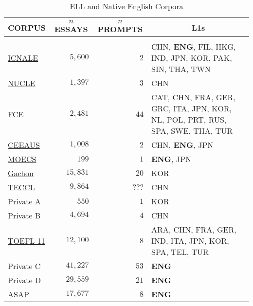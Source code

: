 \documentclass{article} %
\begin{document}
\begin{table}[t]
\caption{ELL and Native English Corpora}
\label{data-table}
\begin{center}
\begin{tabularx}{\textwidth}{l r r X}
\multicolumn{1}{c}{\bf CORPUS} &\multicolumn{1}{c}{\bf $n$ ESSAYS} &\multicolumn{1}{c}{\bf $n$ PROMPTS} &\multicolumn{1}{c}{\bf L1s}
\\ \hline \\
\hline
\href{http://language.sakura.ne.jp/icnale/}{ICNALE} & $5,600$ & $2$ & CHN, \textbf{ENG}, FIL, HKG, IND, JPN, \newline KOR, PAK, SIN, THA, TWN \\
\href{http://www.comp.nus.edu.sg/~nlp/conll14st.html\#nucle32}{NUCLE} & $1,397$ & $3$ & CHN \\
\href{http://ilexir.co.uk/datasets/index.html}{FCE} & $2,481$ & $44$ & CAT, CHN, FRA, GER, GRC, ITA, \newline JPN, KOR, NL, POL, PRT, RUS, \newline SPA, SWE, THA, TUR \\
\href{https://meta-toolkit.org/data/2016-01-26/ceeaus.tar.gz}{CEEAUS} & $1,008$ & $2$ & CHN, \textbf{ENG}, JPN \\
\href{http://www.u-sacred-heart.ac.jp/okugiri/links/moecs/links/data/data.html}{MOECS} & $199$ & $1$ & \textbf{ENG}, JPN \\
\href{http://koreanlearnercorpusblog.blogspot.be/p/corpus.html}{Gachon} & $15,831$ & $20$ & KOR \\
\href{http://www.bfsu-corpus.org/static/corpora/TECCL_Corpus_V1.1.zip}{TECCL} & $9,864$ & $???$ & CHN \\
Private A & $550$ & $1$ & KOR \\
Private B & $4,694$ & $4$ & CHN \\
\href{https://catalog.ldc.upenn.edu/LDC2014T06}{TOEFL-11} & $12,100$ & $8$ & ARA, CHN, FRA, GER, IND, ITA, \newline JPN, KOR, SPA, TEL, TUR \\
Private C & $41,227$ & $53$ & \textbf{ENG} \\
Private D & $29,559$ & $21$ & \textbf{ENG} \\
\href{https://www.kaggle.com/c/asap-aes/data}{ASAP} & $17,677$ & $8$ & \textbf{ENG} \\
\end{tabularx}
\end{center}
\end{table}
\end{document}
